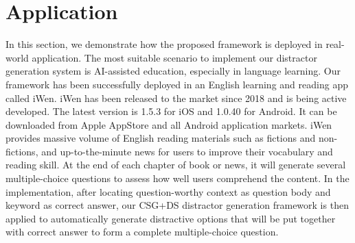 \section{Application}
In this section, we demonstrate how the proposed framework is deployed in real-world application. The  most suitable scenario to implement our distractor generation system is AI-assisted education, especially in language learning. Our framework has been successfully deployed in an English learning and reading app called iWen. iWen has been released to the market since 2018 and is being active developed. The latest version is 1.5.3 for iOS and 1.0.40 for Android. It can be downloaded from Apple AppStore and 
all Android application markets. iWen provides massive volume of English reading materials 
such as fictions and non-fictions, and up-to-the-minute news for users to improve their 
vocabulary and reading skill. At the end of each chapter of book or news, it will generate 
several multiple-choice questions to assess how well users comprehend the content. 
In the implementation, after locating question-worthy context as question body and keyword as 
correct answer, our CSG+DS distractor generation framework is then applied to 
automatically generate distractive options that will be put together with correct answer 
to form a complete multiple-choice question.

